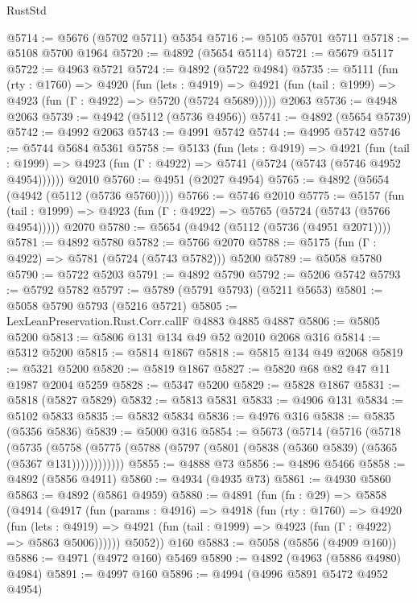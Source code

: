 \begin{lexlean}{RustStd}
\begin{coremodule}
@5714 := @5676 (@5702 @5711) @5354
@5716 := @5105 @5701 @5711
@5718 := @5108 @5700 @1964
@5720 := @4892 (@5654 @5114)
@5721 := @5679 @5117
@5722 := @4963 @5721
@5724 := @4892 (@5722 @4984)
@5735 := @5111
    (fun (rty : @1760) =>
    @4920
      (fun (lets : @4919) =>
      @4921 (fun (tail : @1999) => @4923 (fun (Γ : @4922) => @5720 (@5724 @5689)))))
    @2063
@5736 := @4948 @2063
@5739 := @4942 (@5112 (@5736 @4956))
@5741 := @4892 (@5654 @5739)
@5742 := @4992 @2063
@5743 := @4991 @5742
@5744 := @4995 @5742
@5746 := @5744 @5684 @5361
@5758 := @5133
    (fun (lets : @4919) =>
    @4921
      (fun (tail : @1999) => @4923 (fun (Γ : @4922) => @5741 (@5724 (@5743 (@5746 @4952 @4954))))))
    @2010
@5760 := @4951 (@2027 @4954)
@5765 := @4892 (@5654 (@4942 (@5112 (@5736 @5760))))
@5766 := @5746 @2010
@5775 := @5157
    (fun (tail : @1999) => @4923 (fun (Γ : @4922) => @5765 (@5724 (@5743 (@5766 @4954)))))
    @2070
@5780 := @5654 (@4942 (@5112 (@5736 (@4951 @2071))))
@5781 := @4892 @5780
@5782 := @5766 @2070
@5788 := @5175 (fun (Γ : @4922) => @5781 (@5724 (@5743 @5782))) @5200
@5789 := @5058 @5780
@5790 := @5722 @5203
@5791 := @4892 @5790
@5792 := @5206 @5742
@5793 := @5792 @5782
@5797 := @5789 (@5791 @5793) (@5211 @5653)
@5801 := @5058 @5790 @5793 (@5216 @5721)
@5805 := LexLeanPreservation.Rust.Corr.callF @4883 @4885 @4887
@5806 := @5805 @5200
@5813 := @5806 @131 @134 @49 @52 @2010 @2068 @316
@5814 := @5312 @5200
@5815 := @5814 @1867
@5818 := @5815 @134 @49 @2068
@5819 := @5321 @5200
@5820 := @5819 @1867
@5827 := @5820 @68 @82 @47 @11 @1987 @2004 @5259
@5828 := @5347 @5200
@5829 := @5828 @1867
@5831 := @5818 (@5827 @5829)
@5832 := @5813 @5831
@5833 := @4906 @131
@5834 := @5102 @5833
@5835 := @5832 @5834
@5836 := @4976 @316
@5838 := @5835 (@5356 @5836)
@5839 := @5000 @316
@5854 := @5673
    (@5714
      (@5716
        (@5718
          (@5735
            (@5758 (@5775 (@5788 (@5797 (@5801 (@5838 (@5360 @5839) (@5365 (@5367 @131))))))))))))
@5855 := @4888 @73
@5856 := @4896 @5466
@5858 := @4892 (@5856 @4911)
@5860 := @4934 (@4935 @73)
@5861 := @4930 @5860
@5863 := @4892 (@5861 @4959)
@5880 := @4891
    (fun (fn : @29) =>
    @5858
      (@4914
        (@4917
          (fun (params : @4916) =>
          @4918
            (fun (rty : @1760) =>
            @4920
              (fun (lets : @4919) =>
              @4921 (fun (tail : @1999) => @4923 (fun (Γ : @4922) => @5863 @5006))))))
        @5052))
    @160
@5883 := @5058 (@5856 (@4909 @160))
@5886 := @4971 (@4972 @160) @5469
@5890 := @4892 (@4963 (@5886 @4980) @4984)
@5891 := @4997 @160
@5896 := @4994 (@4996 @5891 @5472 @4952 @4954)

\end{coremodule}
\end{lexlean}
